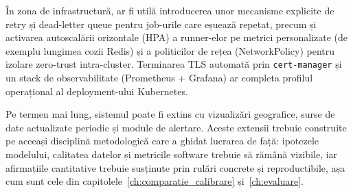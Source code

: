 În zona de infrastructură, ar fi utilă introducerea unor mecanisme explicite
de retry și dead-letter queue pentru job-urile care eșuează repetat, precum și
activarea autoscalării orizontale (HPA) a runner-elor pe metrici personalizate
(de exemplu lungimea cozii Redis) și a politicilor de rețea (NetworkPolicy)
pentru izolare zero-trust intra-cluster. Terminarea TLS automată prin
\texttt{cert-manager} și un stack de observabilitate (Prometheus + Grafana) ar
completa profilul operațional al deployment-ului Kubernetes.

Pe termen mai lung, sistemul poate fi extins cu vizualizări geografice, surse
de date actualizate periodic și module de alertare. Aceste extensii trebuie
construite pe aceeași disciplină metodologică care a ghidat lucrarea de față:
ipotezele modelului, calitatea datelor și metricile software trebuie să rămână
vizibile, iar afirmațiile cantitative trebuie susținute prin rulări concrete și
reproductibile, așa cum sunt cele din capitolele~\ref{ch:comparatie_calibrare}
și~\ref{ch:evaluare}.
